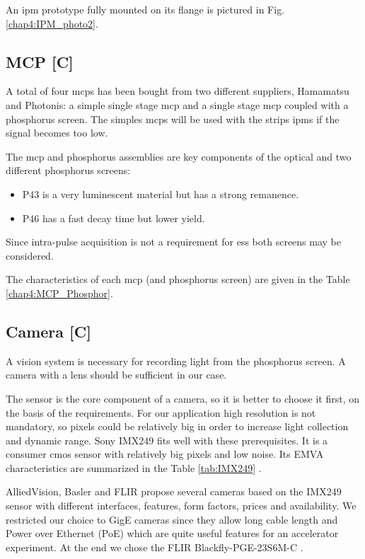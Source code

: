 \begin{refsection}
  An \acrshort{ipm} prototype fully mounted on its flange is pictured in Fig. \ref{chap4:IPM_photo2}.

  \subsection{MCP [C]}
  A total of four \acrshort{mcp}s has been bought from two different suppliers, Hamamatsu and Photonis: a simple single stage \acrshort{mcp} and a single stage \acrshort{mcp} coupled with a phosphorus screen. The simples \acrshort{mcp}s will be used with the strips \acrshort{ipm}s if the signal becomes too low.

  The \acrshort{mcp} and phosphorus assemblies are key components of the optical and two different phosphorus screens:
  \begin{itemize}
    \item P43 is a very luminescent material but has a strong remanence.
    \item P46 has a fast decay time but lower yield.
  \end{itemize}
  Since intra-pulse acquisition is not a requirement for \acrshort{ess} both screens may be considered.

  The characteristics of each \acrshort{mcp} (and phosphorus screen) are given in the Table \ref{chap4:MCP_Phosphor}.
  

  \subsection{Camera [C]}
  A vision system is necessary for recording light from the phosphorus screen.
  A camera with a lens should be sufficient in our case.

  The sensor is the core component of a camera, so it is better to choose it first, on the basis of the requirements.
  For our application high resolution is not mandatory, so pixels could be relatively big in order to increase light collection and dynamic range.
  Sony IMX249 fits well with these prerequisites. It is a consumer \acrshort{cmos} sensor with relatively big pixels and low noise.
  Its EMVA characteristics are summarized in the Table \ref{tab:IMX249} \cite{emva2010}.
  

  AlliedVision, Basler and FLIR propose several cameras based on the IMX249 sensor with different interfaces, features, form factors, prices and availability.
  We restricted our choice to GigE cameras since they allow long cable length and Power over Ethernet (PoE) which are quite useful features for an accelerator experiment.
  At the end we chose the FLIR Blackfly-PGE-23S6M-C \cite{blackfly2019}.


\end{refsection}
